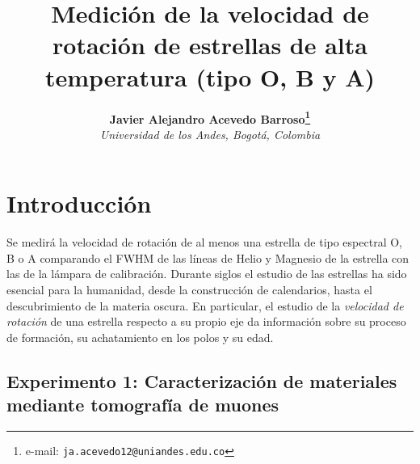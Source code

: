 \documentclass[notitlepage,letterpaper,12pt]{article} %
\begin{document}
\title{Medición de la velocidad de rotación de estrellas de alta temperatura (tipo O, B y A)}
\author{
\textbf{Javier Alejandro Acevedo Barroso\thanks{e-mail: \texttt{ja.acevedo12@uniandes.edu.co}}}\\
\textit{Universidad de los Andes, Bogotá, Colombia}\\
} %

\maketitle %



\section{Introducción}
Se medirá la velocidad de rotación de al menos una estrella de tipo espectral O, B o A comparando el FWHM de las líneas de Helio y Magnesio de la estrella con las de la lámpara de calibración.   Durante siglos el estudio de las estrellas ha sido esencial para la humanidad, desde la construcción de calendarios, hasta el descubrimiento de la materia oscura. En particular, el estudio de la \emph{velocidad de rotación} de una estrella respecto a su propio eje da información sobre su proceso de formación, su achatamiento en los polos y su edad.

\subsection{Experimento 1: Caracterización de materiales mediante tomografía de muones }
\end{document}
